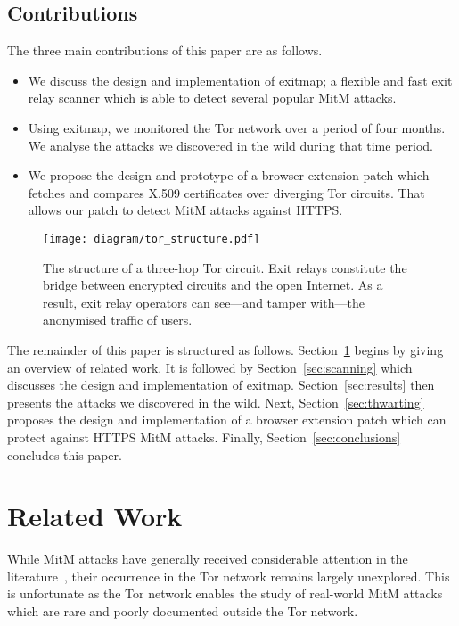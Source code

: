 \documentclass[letterpaper,twocolumn,10pt]{article}
\begin{document}
\subsection{Contributions}
The three main contributions of this paper are as follows.
\begin{itemize}
	\item We discuss the design and implementation of \textsf{exitmap}; a flexible and fast exit
		relay scanner which is able to detect several popular MitM attacks.
	\item Using \textsf{exitmap}, we monitored the Tor network over a period of four months.  We
		analyse the attacks we discovered in the wild during that time period.
	\item We propose the design and prototype of a browser extension patch which fetches and
		compares X.509 certificates over diverging Tor circuits.  That allows our patch to detect
		MitM attacks against HTTPS.
\end{itemize}

\begin{figure}[t]
	\centering
	\texttt{[image: diagram/tor\_structure.pdf]}
	\caption{The structure of a three-hop Tor circuit.  Exit relays constitute the bridge between
	encrypted circuits and the open Internet.  As a result, exit relay operators can see---and
	tamper with---the anonymised traffic of users.}
	\label{fig:exits}
\end{figure}

The remainder of this paper is structured as follows.  Section~\ref{sec:related} begins by giving an
overview of related work.  It is followed by Section~\ref{sec:scanning} which discusses the design
and implementation of \textsf{exitmap}.  Section~\ref{sec:results} then presents the attacks we
discovered in the wild.  Next, Section~\ref{sec:thwarting} proposes the design and implementation of
a browser extension patch which can protect against HTTPS MitM attacks.  Finally,
Section~\ref{sec:conclusions} concludes this paper.

\section{Related Work}
\label{sec:related}
While MitM attacks have generally received considerable attention in the
literature~\cite{Holz2012,Wendlandt2008}, their occurrence in the Tor network remains largely
unexplored.  This is unfortunate as the Tor network enables the study of real-world MitM attacks
which are rare and poorly documented outside the Tor network.
\end{document}
